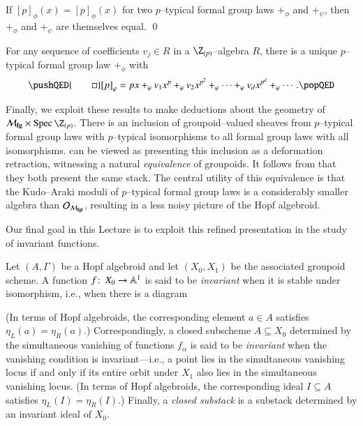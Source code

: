 \begin{corollary}\label{PSeriesDetermines}
If $[p]_\phi(x) = [p]_\phi(x)$ for two $p$--typical formal group laws $+_\phi$ and $+_\psi$, then $+_\phi$ and $+_\psi$ are themselves equal. \qed
\end{corollary}

\begin{corollary}\label{EveryPSeriesArises}
For any sequence of coefficients $v_j \in R$ in a $\Z_{(p)}$--algebra $R$, there is a unique $p$--typical formal group law $+_\phi$ with
\[\pushQED{\qed}
[p]_\phi = px +_\phi v_1 x^p +_\phi v_2 x^{p^2} +_\phi \cdots +_\phi v_d x^{p^d} +_\phi \cdots. \qedhere
\popQED\]
\end{corollary}

Finally, we exploit these results to make deductions about the geometry of $\moduli{fg} \times \Spec \Z_{(p)}$.  There is an inclusion of groupoid--valued sheaves from $p$--typical formal group laws with $p$--typical isomorphisms to all formal group laws with all isomorphisms.   can be viewed as presenting this inclusion as a deformation retraction, witnessing a natural \emph{equivalence} of groupoids.  It follows from  that they both present the same stack.  The central utility of this equivalence is that the Kudo--Araki moduli of $p$--typical formal group laws is a considerably smaller algebra than $\mathcal{O}_{\mathcal{M}_{\mathbf{fgl}}}$, resulting in a less noisy picture of the Hopf algebroid.

Our final goal in this Lecture is to exploit this refined presentation in the study of invariant functions.
\begin{definition}\label{DefnClosedSubstack}
Let $(A, \Gamma)$ be a Hopf algebroid and let $(X_0, X_1)$ be the associated groupoid scheme.  A function $f\colon\thinspace X_0 \to \mathbb A^1$ is said to be \textit{invariant} when it is stable under isomorphism, i.e., when there is a diagram
\begin{center}
\end{center}
(In terms of Hopf algebroids, the corresponding element $a \in A$ satisfies $\eta_L(a) = \eta_R(a)$.)  Correspondingly, a closed subscheme $A \subseteq X_0$ determined by the simultaneous vanishing of functions $f_\alpha$ is said to be \textit{invariant} when the vanishing condition is invariant---i.e., a point lies in the simultaneous vanishing locus if and only if its entire orbit under $X_1$ also lies in the simultaneous vanishing locus.  (In terms of Hopf algebroids, the corresponding ideal $I \subseteq A$ satisfies $\eta_L(I) = \eta_R(I)$.)  Finally, a \textit{closed substack} is a substack determined by an invariant ideal of $X_0$.
\end{definition}

